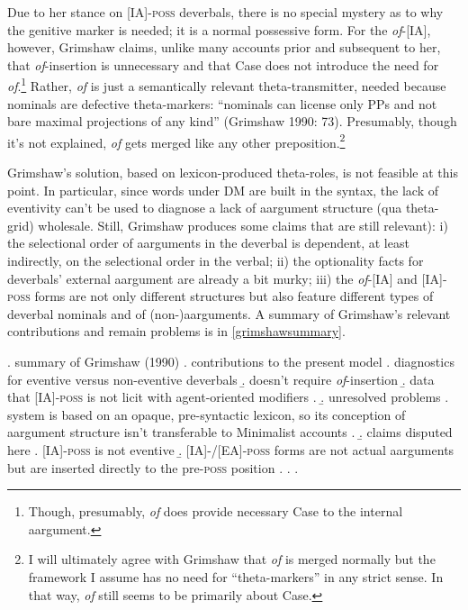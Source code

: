 \documentclass[12pt]{article}
\begin{document}
\doublespacing

Due to her stance on [IA]-\textsc{poss} deverbals, there is no special mystery as to why the genitive marker is needed; it is a normal possessive form. For the \textit{of}-[IA], however, Grimshaw claims, unlike many accounts prior and subsequent to her, that \textit{of}-insertion is unnecessary and that Case does not introduce the need for \textit{of}.\footnote{ Though, presumably, \textit{of} does provide necessary Case to the internal aargument.} Rather, \textit{of} is just a semantically relevant theta-transmitter, needed because nominals are defective theta-markers: ``nominals can license only PPs and not bare maximal projections of any kind'' (Grimshaw 1990: 73). Presumably, though it's not explained, \textit{of} gets merged like any other preposition.\footnote{ I will ultimately agree with Grimshaw that \textit{of} is merged normally but the framework I assume has no need for ``theta-markers'' in any strict sense. In that way, \textit{of} still seems to be primarily about Case.}

Grimshaw's solution, based on lexicon-produced theta-roles, is not feasible at this point. In particular, since words under DM are built in the syntax, the lack of eventivity can't be used to diagnose a lack of aargument structure (qua theta-grid) wholesale. Still, Grimshaw produces some claims that are still relevant): i) the selectional order of aarguments in the deverbal is dependent, at least indirectly, on the selectional order in the verbal; ii) the optionality facts for deverbals' external aargument are already a bit murky; iii) the \textit{of}-[IA] and [IA]-\textsc{poss} forms are not only different structures but also feature different types of deverbal nominals and of (non-)aarguments. A summary of Grimshaw's relevant contributions and remain problems is in \ref{grimshawsummary}.

\singlespacing

\ex.\label{grimshawsummary} summary of Grimshaw (1990)
\a. contributions to the present model
\a. diagnostics for eventive versus non-eventive deverbals
\b. doesn't require \textit{of}-insertion
\b. data that [IA]-\textsc{poss} is not licit with agent-oriented modifiers
\z.
\b. unresolved problems
\a. system is based on an opaque, pre-syntactic lexicon, so its conception of aargument structure isn't transferable to Minimalist accounts
\z. 
\b. claims disputed here
\a. [IA]-\textsc{poss} is not eventive
\b. [IA]-/[EA]-\textsc{poss} forms are not actual aarguments but are inserted directly to the pre-\textsc{poss} position
\z. \z. \z. \par \par
\end{document}
